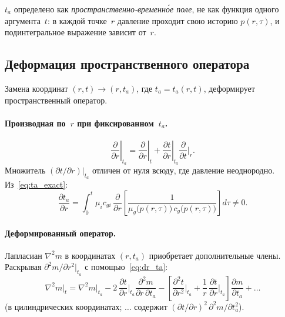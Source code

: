\documentclass[12pt,a4paper]{article}
\begin{document}
$t_a$ определено как \emph{пространственно-временн\'{о}е поле},
не как функция одного аргумента~$t$:
в каждой точке~$r$ давление проходит свою историю $p(r,\tau)$,
и подинтегральное выражение зависит от~$r$.

\subsection{Деформация пространственного оператора}
\label{ssec:deformation}

Замена координат $(r,t) \to (r,t_a)$, где $t_a = t_a(r,t)$,
деформирует пространственный оператор.

\paragraph{Производная по~$r$ при фиксированном~$t_a$.}
\begin{equation}\label{eq:dr_ta}
  \left.\frac{\partial}{\partial r}\right|_{t_a}
  = \left.\frac{\partial}{\partial r}\right|_{t}
  + \left.\frac{\partial t}{\partial r}\right|_{t_a}
    \frac{\partial}{\partial t}\bigg|_{r}.
\end{equation}
Множитель $(\partial t/\partial r)|_{t_a}$ отличен от нуля
всюду, где давление неоднородно. Из~\eqref{eq:ta_exact}:
\begin{equation}\label{eq:dta_dr}
  \frac{\partial t_a}{\partial r}
  = \int_0^t \mu_i c_{gi}\,
  \frac{\partial}{\partial r}
  \!\left[\frac{1}{\mu_g\bigl(p(r,\tau)\bigr)\,
  c_g\bigl(p(r,\tau)\bigr)}\right] d\tau
  \neq 0.
\end{equation}

\paragraph{Деформированный оператор.}
Лапласиан $\nabla^2 m$ в координатах $(r,t_a)$
приобретает дополнительные члены. Раскрывая
$\partial^2 m/\partial r^2|_{t_a}$ с помощью~\eqref{eq:dr_ta}:
\begin{equation}\label{eq:laplacian_deformed}
  \nabla^2 m\Big|_{t} = \nabla^2 m\Big|_{t_a}
  - 2\,\frac{\partial t}{\partial r}\bigg|_{t_a}
    \frac{\partial^2 m}{\partial r\,\partial t_a}
  - \left[\frac{\partial^2 t}{\partial r^2}\bigg|_{t_a}
  + \frac{1}{r}\,\frac{\partial t}{\partial r}\bigg|_{t_a}\right]
    \frac{\partial m}{\partial t_a}
  + \ldots
\end{equation}
(в цилиндрических координатах; $\ldots$ содержит
$(\partial t/\partial r)^2\,\partial^2 m/\partial t_a^2$).
\end{document}
